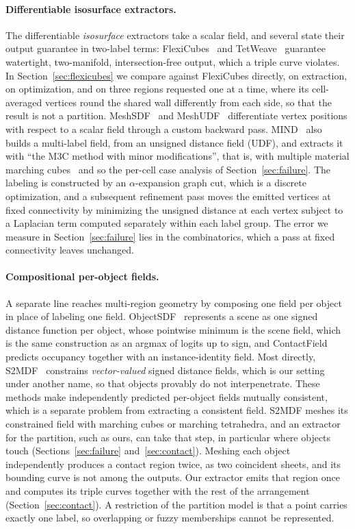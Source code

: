 \documentclass{egpubl}
\theoremstyle{definition}
\begin{document}
\paragraph{Differentiable isosurface extractors.} The differentiable
\emph{isosurface} extractors take a scalar field, and several state
their output guarantee in two-label terms: FlexiCubes~\cite{shen2023} and
TetWeave~\cite{tetweave2025} guarantee watertight, two-manifold,
intersection-free output, which a triple curve violates. In
Section~\ref{sec:flexicubes} we compare against FlexiCubes directly, on
extraction, on optimization, and on three regions requested one at a time,
where its cell-averaged vertices round the shared wall differently from each
side, so that the result is not a partition. MeshSDF~\cite{remelli2020} and
MeshUDF~\cite{guillard2022} differentiate vertex positions with respect to a
scalar field through a custom backward pass. MIND~\cite{mind2025} also
builds a multi-label field, from an
unsigned distance field (UDF), and extracts it with ``the M3C method with minor
modifications'', that is, with multiple material marching
cubes~\cite{wu2003} and so the per-cell case analysis of
Section~\ref{sec:failure}. The labeling is constructed
by an $\alpha$-expansion graph cut, which is a discrete optimization, and a
subsequent refinement pass moves the emitted vertices at fixed connectivity by
minimizing the unsigned distance at each vertex subject to a Laplacian term
computed separately within each label group. The error we measure in
Section~\ref{sec:failure} lies in the combinatorics, which a pass at fixed
connectivity leaves unchanged.

\paragraph{Compositional per-object fields.} A separate line reaches
multi-region geometry by composing one field per object in place of labeling
one field. ObjectSDF~\cite{objectsdf2022} represents a scene
as one signed distance function per object, whose pointwise minimum is the
scene field, which is the same construction as an argmax of logits up to sign,
and ContactField~\cite{contactfield2024} predicts occupancy together with an
instance-identity field. Most directly, S2MDF~\cite{s2mdf2026} constrains
\emph{vector-valued} signed distance fields, which is our setting under another
name, so that objects provably do not interpenetrate. These methods make
independently predicted per-object fields mutually consistent, which is a
separate problem from extracting a consistent field. S2MDF meshes its constrained field with marching cubes or marching
tetrahedra, and an extractor for the partition, such as ours, can take that
step, in particular where objects touch (Sections~\ref{sec:failure}
and~\ref{sec:contact}).
Meshing each object independently produces a contact region twice, as two
coincident sheets, and its bounding curve is not among the outputs. Our
extractor emits that region once and computes its triple curves together
with the rest of the arrangement (Section~\ref{sec:contact}). A restriction
of the partition model is that a point carries exactly one label, so
overlapping or fuzzy memberships cannot be represented.
\end{document}
